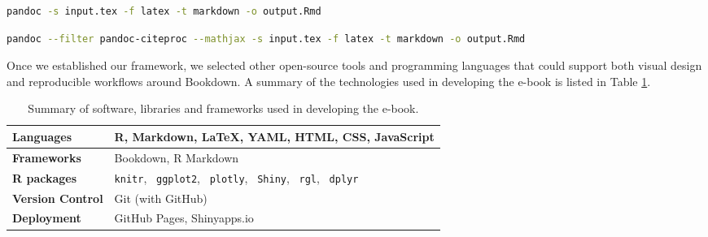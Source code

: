 \documentclass[11pt]{article}
\begin{document}
\begin{lstlisting}[language=bash,
                   caption={Basic conversion of a LaTeX .tex file to an R Markdown .Rmd file using Pandoc.},
                   label={lst:tex_to_rmd_basic},
                   captionpos=b] 
pandoc -s input.tex -f latex -t markdown -o output.Rmd
\end{lstlisting}

\begin{lstlisting}[language=bash,
                   caption={Conversion of a LaTeX .tex file to an R Markdown .Rmd file rendered with MathJax using Pandoc.},
                   label={lst:tex_to_rmd_mathjax},
                   captionpos=b] 
pandoc --filter pandoc-citeproc --mathjax -s input.tex -f latex -t markdown -o output.Rmd
\end{lstlisting}

Once we established our framework, we selected other open-source tools and programming languages that could support both visual design and reproducible workflows around Bookdown. A summary of the technologies used in developing the e-book is listed in Table \ref{tab:ebook_Technologies}.

\renewcommand\arraystretch{1.20}
\begin{table}[H]
\setlength{\belowcaptionskip}{-25pt}
\begin{center}
\begin{tabular}{| l | l |}
\hline
\textbf{Languages}		&	R, Markdown, LaTeX, YAML, HTML, CSS, JavaScript\\
\hline
\textbf{Frameworks} 		&	Bookdown, R Markdown\\
\hline
\textbf{R packages}		&	\texttt{knitr}, \, \texttt{ggplot2}, \, \texttt{plotly}, \, \texttt{Shiny}, \, \texttt{rgl}, \, \texttt{dplyr} \\
\hline
\textbf{Version Control} 	&	Git (with GitHub)\\
\hline
\textbf{Deployment} 		&	GitHub Pages, Shinyapps.io \\
\hline
\end{tabular}
\caption{Summary of software, libraries and frameworks used in developing the e-book.}
\label{tab:ebook_Technologies}
\end{center}
\end{table}
\renewcommand\arraystretch{1.00}
\end{document}
